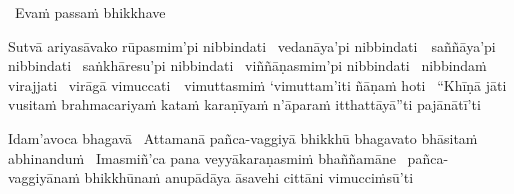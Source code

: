 \ifasixversion\clearpage\fi

\begin{pali-leader}
  \anglebracketleft\ \hspace{-0.5mm}Evaṁ passaṁ bhikkhave \hspace{-0.5mm}\anglebracketright\
\end{pali-leader}
\begin{pali-hangtogether}
  Sutvā ariyasāvako rūpasmim'pi nibbindati \breathmark\ vedanāya'pi \mbox{nibbindati}~\breathmark\ saññāya'pi nibbindati \breathmark\ saṅkhāresu'pi nibbindati \breathmark\ viññāṇasmim'pi nibbindati \breathmark\ nibbindaṁ virajjati \breathmark\ virāgā \mbox{vimuccati}~\breathmark\ vimuttasmiṁ `vimuttam'iti ñāṇaṁ hoti \breathmark\ ``Khīṇā jāti vusitaṁ brahmacariyaṁ kataṁ karaṇīyaṁ n'āparaṁ itthattāyā''ti pajānātī'ti
\end{pali-hangtogether}

\clearpage

\begin{pali-hang}
  Idam'avoca bhagavā \breathmark\ Attamanā pañca-vaggiyā bhikkhū bhagavato bhāsitaṁ abhinanduṁ \breathmark\ Imasmiñ'ca pana veyyākaraṇasmiṁ bhaññamāne \breathmark\ pañca-vaggiyānaṁ bhikkhūnaṁ anupādāya āsavehi cittāni vimucciṁsū'ti
\end{pali-hang}

\suttaRef{[SN 22.59]}

